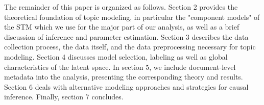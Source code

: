 The remainder of this paper is organized as follows. Section 2 provides the theoretical foundation of topic modeling, in particular the "component models" of the STM which we use for the major part of our analysis, as well as a brief discussion of inference and parameter estimation. Section 3 describes the data collection process, the data itself, and the data preprocessing necessary for topic modeling. Section 4 discusses model selection, labeling as well as global characteristics of the latent space. In section 5, we include document-level metadata into the analysis, presenting the corresponding theory and results. Section 6 deals with alternative modeling approaches and strategies for causal inference. Finally, section 7 concludes.